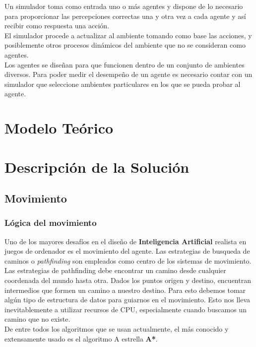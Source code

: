 \documentclass[a4paper,12pt,oneside]{book}
\begin{document}
Un simulador toma como entrada uno o más agentes y dispone de lo
necesario para proporcionar las percepciones correctas una y otra vez
a cada agente y así recibir como respuesta una acción.\\

El simulador procede a actualizar  al ambiente tomando como base las
acciones, y posiblemente otros procesos dinámicos del ambiente que no
se consideran como agentes.\\

Los agentes se diseñan para que funcionen dentro de un conjunto de
ambientes diversos. Para poder medir el desempeño de un agente es
necesario contar con un simulador que seleccione ambientes
particulares en los que se pueda probar al agente.

\chapter{Modelo Teórico}

\chapter{Descripción de la Solución}

\section {Movimiento}

\subsection{Lógica del movimiento}
Uno de los mayores desafíos en el diseño de {\bf Inteligencia
  Artificial} realista en juegos de ordenador es el movimiento del
agente. Las estrategias de busqueda de caminos o {\it pathfinding} son
empleados como centro de los sistemas de movimiento.\\

Las estrategias de pathfinding debe encontrar un camino desde
cualquier coordenada del mundo hasta otra. Dados los puntos origen y
destino, encuentran intermedios que formen un camino a nuestro
destino. Para esto debemos tomar algún tipo de estructura de datos
para guiarnos en el movimiento. Esto nos lleva inevitablemente a
utilizar recursos de CPU, especialmente cuando buscamos un camino que
no existe.\\

De entre todos los algoritmos que se usan actualmente, el más conocido
y extensamente usado es el algoritmo A estrella {\bf A*}. \\
\end{document}
